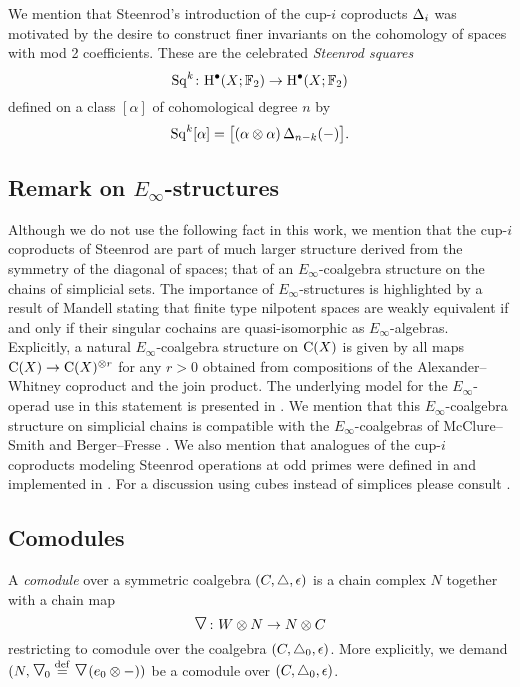 We mention that Steenrod's introduction of the cup-$i$ coproducts $\operatorname{\Delta}_i$ was motivated by the desire to construct finer invariants on the cohomology of spaces with mod 2 coefficients.
These are the celebrated \textit{Steenrod squares}
\[
\operatorname{Sq}^k \colon \mathrm{H}^\bullet(X; {\mathbb{F}_2}) \to \mathrm{H}^\bullet(X; {\mathbb{F}_2})
\]
defined on a class $[\alpha]$ of cohomological degree $n$ by
\[
\operatorname{Sq}^k [\alpha] = \big[ (\alpha \otimes \alpha) \operatorname{\Delta}_{n-k}(-) \big].
\]

\subsection{Remark on $E_\infty$-structures}

Although we do not use the following fact in this work, we mention that the cup-$i$ coproducts of Steenrod are part of much larger structure derived from the symmetry of the diagonal of spaces; that of an $E_\infty$-coalgebra structure on the chains of simplicial sets.
The importance of $E_\infty$-structures is highlighted by a result of Mandell \cite{mandell2006homotopy_type} stating that finite type nilpotent spaces are weakly equivalent if and only if their singular cochains are quasi-isomorphic as $E_\infty$-algebras.
Explicitly, a natural $E_\infty$-coalgebra structure on $\operatorname{C}(X)$ is given by all maps $\operatorname{C}(X) \to \operatorname{C}(X)^{\otimes r}$ for any $r > 0$ obtained from compositions of the Alexander--Whitney coproduct and the join product.
The underlying model for the $E_\infty$-operad use in this statement is presented in \cite{medina2020prop1, medina2021prop2}.
We mention that this $E_\infty$-coalgebra structure on simplicial chains is compatible with the $E_\infty$-coalgebras of McClure--Smith \cite{mcclure2003multivariable} and Berger--Fresse \cite{berger2004combinatorial}.
We also mention that analogues of the cup-$i$ coproducts modeling Steenrod operations at odd primes were defined in \cite{medina2021may_st} and implemented in \cite{medina2021comch}.
For a discussion using cubes instead of simplices please consult \cite{medina2022cube_einfty}.

\subsection{Comodules}

A \textit{comodule} over a symmetric coalgebra $(C, \triangle, \operatorname{\epsilon})$ is a chain complex $N$ together with a chain map
\[
\text{\Large$\triangledown$} \colon W \otimes N \to N \otimes C
\]
restricting to comodule over the coalgebra $(C, \triangle_0, \operatorname{\epsilon})$.
More explicitly, we
demand $(N, \text{\Large$\triangledown$}_{\!0} \stackrel{\mathrm{def}}{=} \text{\Large$\triangledown$}(e_0 \otimes -))$ be a comodule over $(C, \triangle_0, \operatorname{\epsilon})$.


